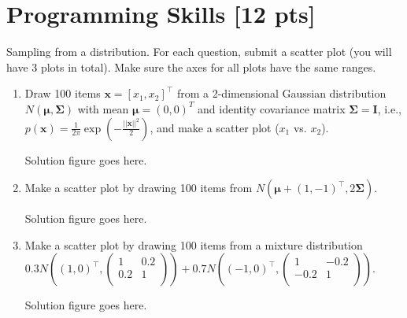 \documentclass[a4paper]{article}
\theoremstyle{definition}
\newcommand{\vc}[1]{\boldsymbol{#1}}
\newcommand{\Sigmav}{\vc{\Sigma}}
\newcommand{\muv}{\vc{\mu}}
\newenvironment{soln}{
    \leavevmode\color{blue}\ignorespaces
}{}
\begin{document}
\section{Programming Skills [12 pts]}
Sampling from a distribution.  For each question, submit a scatter plot (you will have 3 plots in total).  Make sure the axes for all plots have the same ranges.
\begin{enumerate}
\item Draw 100 items $\mathbf{x} = [x_1, x_2]^\top$ from a
  2-dimensional Gaussian distribution $N(\muv, \Sigmav)$ with mean $\muv=(0, 0)^T$ and
  identity covariance matrix $\Sigmav=\mathbf I$, i.e.,
  $p(\mathbf{x}) =
  \frac{1}{2\pi}\exp\left(-\frac{||\mathbf{x}||^2}{2}\right)$, and
  make a scatter plot ($x_1$ vs. $x_2$).  
  
	\begin{soln}
	    Solution figure goes here.
	\end{soln}
\item Make a scatter plot by drawing 100 items from $N(\muv + (1, -1)^\top, 2 \Sigmav)$.

	\begin{soln}
	    Solution figure goes here.
	\end{soln}
\item Make a scatter plot by drawing 100 items from a mixture distribution 
$0.3 N\left((1, 0)^\top, \begin{pmatrix} 1 & 0.2 \\ 0.2 & 1\\ \end{pmatrix}\right)
+0.7 N\left((-1, 0)^\top, \begin{pmatrix} 1 & -0.2 \\ -0.2 & 1\\ \end{pmatrix}\right)
$.

  	\begin{soln}
  	    Solution figure goes here.
	\end{soln}
\end{enumerate}





\end{document}
